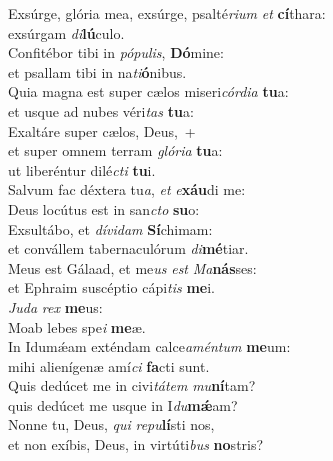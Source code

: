 \evenverse Exsúrge, glória mea, exsúrge, psalté\textit{ri}\textit{um} \textit{et} \textbf{cí}thara:~\*\\
\evenverse exsúrgam \textit{di}\textbf{lú}culo.\\
\oddverse Confitébor tibi in \textit{pó}\textit{pu}\textit{lis}, \textbf{Dó}mine:~\*\\
\oddverse et psallam tibi in na\textit{ti}\textbf{ó}nibus.\\
\evenverse Quia magna est super cælos miseri\textit{cór}\textit{di}\textit{a} \textbf{tu}a:~\*\\
\evenverse et usque ad nubes véri\textit{tas} \textbf{tu}a:\\
\oddverse Exaltáre super cælos, Deus,~+\\
\oddverse  et super omnem terram \textit{gló}\textit{ri}\textit{a} \textbf{tu}a:~\*\\
\oddverse ut liberéntur dilé\textit{cti} \textbf{tu}i.\\
\evenverse Salvum fac déxtera tu\textit{a}, \textit{et} \textit{e}\textbf{xáu}di me:~\*\\
\evenverse Deus locútus est in san\textit{cto} \textbf{su}o:\\
\oddverse Exsultábo, et \textit{dí}\textit{vi}\textit{dam} \textbf{Sí}chimam:~\*\\
\oddverse et convállem tabernaculórum \textit{di}\textbf{mé}tiar.\\
\evenverse Meus est Gálaad, et me\textit{us} \textit{est} \textit{Ma}\textbf{nás}ses:~\*\\
\evenverse et Ephraim suscéptio cápi\textit{tis} \textbf{me}i.\\
\oddverse \textit{Ju}\textit{da} \textit{rex} \textbf{me}us:~\*\\
\oddverse Moab lebes spe\textit{i} \textbf{me}æ.\\
\evenverse In Idumǽam exténdam calce\textit{a}\textit{mén}\textit{tum} \textbf{me}um:~\*\\
\evenverse mihi alienígenæ amí\textit{ci} \textbf{fa}cti sunt.\\
\oddverse Quis dedúcet me in civi\textit{tá}\textit{tem} \textit{mu}\textbf{ní}tam?~\*\\
\oddverse quis dedúcet me usque in I\textit{du}\textbf{mǽ}am?\\
\evenverse Nonne tu, Deus, \textit{qui} \textit{re}\textit{pu}\textbf{lí}sti nos,~\*\\
\evenverse et non exíbis, Deus, in virtúti\textit{bus} \textbf{no}stris?\\
